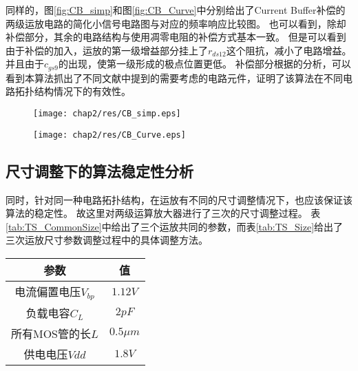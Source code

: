 同样的，图\ref{fig:CB_simp}和图\ref{fig:CB_Curve}中分别给出了Current Buffer补偿的两级运放电路的简化小信号电路图与对应的频率响应比较图。
也可以看到，除却补偿部分，其余的电路结构与使用凋零电阻的补偿方式基本一致。
但是可以看到由于补偿的加入，运放的第一级增益部分挂上了$r_{ds12}$这个阻抗，减小了电路增益。
并且由于$c_{gs9}$的出现，使第一级形成的极点位置更低。
补偿部分根据\parencite{CB1,CB2,Allen-Analog}的分析，可以看到本算法抓出了不同文献中提到的需要考虑的电路元件，证明了该算法在不同电路拓扑结构情况下的有效性。

\begin{figure}[!htp]
	\centering
	\texttt{[image: chap2/res/CB\_simp.eps]}
\end{figure}

\begin{figure}[!htp]
	\centering
	\texttt{[image: chap2/res/CB\_Curve.eps]}
\end{figure}

\subsection{尺寸调整下的算法稳定性分析}
\label{subsec:simp:res:size}

同时，针对同一种电路拓扑结构，在运放有不同的尺寸调整情况下，也应该保证该算法的稳定性。
故这里对两级运算放大器进行了三次的尺寸调整过程。
表\ref{tab:TS_CommonSize}中给出了三个运放共同的参数，而表\ref{tab:TS_Size}给出了三次运放尺寸参数调整过程中的具体调整方法。

\begin{table}[!htbp]
	\centering
	\begin{tabular}{c|c}
		\hline
		      参数       &     值      \\ \hline
		电流偏置电压$V_{bp}$ &  $1.12 V$  \\
		  负载电容$C_L$    &   $2pF$    \\
		 所有MOS管的长$L$   & $0.5\mu m$ \\
		  供电电压$Vdd$    &   $1.8V$   \\ \hline
	\end{tabular}
\end{table}

